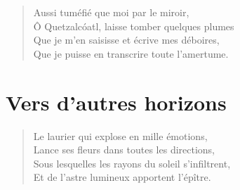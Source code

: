 \begin{verse}%
  \quatrain%
  Aussi tuméfié que moi par le miroir,\\  %
  Ô Quetzalcóatl, laisse tomber quelques plumes\\  %
  Que je m’en saisisse et écrive mes déboires,\\  %
  Que je puisse en transcrire toute l’amertume.
\end{verse}

\section*{Vers d’autres horizons}%
%
%

\begin{verse}%
  \quatrain%
  Le laurier qui explose en mille émotions,\\  %
  Lance ses fleurs dans toutes les directions,\\  %
  Sous lesquelles les rayons du soleil s’infiltrent,\\  %
  Et de l’astre lumineux apportent l’épître.
\end{verse}

